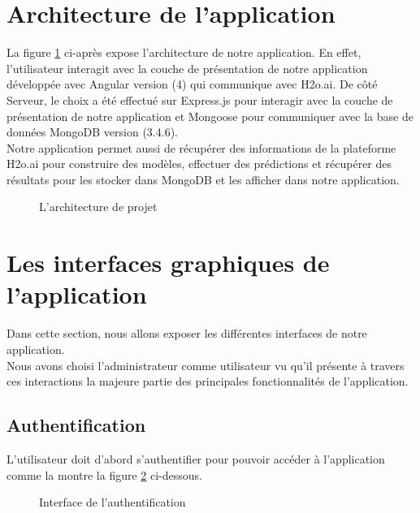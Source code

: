 \section{Architecture de l'application}
La figure \ref{fig:architecture de projet} ci-après expose l'architecture de notre application. En effet, l'utilisateur interagit avec la couche de présentation de notre application développée avec Angular version (4) qui communique avec H2o.ai.
De côté Serveur, le choix a été effectué sur Express.js pour interagir avec la couche de présentation de notre application et Mongoose pour communiquer avec la base de données MongoDB version (3.4.6).\\
Notre application permet aussi de récupérer des informations de la plateforme H2o.ai pour construire des modèles, effectuer des prédictions et récupérer des résultats pour les stocker dans MongoDB et les afficher dans notre application.\\
    \begin{figure}[htpb]
    \centering
    \caption{L'architecture de projet}
    \label{fig:architecture de projet}
    \end{figure}
    \newpage
\section{Les interfaces graphiques de l’application}
Dans cette section, nous allons exposer les différentes interfaces de notre application.\\
Nous avons choisi l’administrateur comme utilisateur vu qu’il présente à travers ces interactions la majeure partie des principales fonctionnalités de l’application.


\subsection{Authentification}
L’utilisateur doit d’abord s’authentifier pour pouvoir accéder à l’application comme la montre la figure  \ref{fig:Interfaceauthentification} ci-dessous.
    \begin{figure}[htpb]
    \centering
    \caption{Interface de l’authentification}
    \label{fig:Interfaceauthentification}
    \end{figure}
